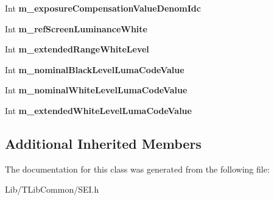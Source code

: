 \begin{DoxyCompactItemize}
\item 
\mbox{\label{class_s_e_i_tone_mapping_info_adbcd651babe98845b088910b87e4436a}} 
Int {\bfseries m\+\_\+exposure\+Compensation\+Value\+Denom\+Idc}
\item 
\mbox{\label{class_s_e_i_tone_mapping_info_a08287240f3bde1ec29950e25a36a51ac}} 
Int {\bfseries m\+\_\+ref\+Screen\+Luminance\+White}
\item 
\mbox{\label{class_s_e_i_tone_mapping_info_acab53b9f7ee20b3cc7b71cd5f24ae6e4}} 
Int {\bfseries m\+\_\+extended\+Range\+White\+Level}
\item 
\mbox{\label{class_s_e_i_tone_mapping_info_a25c9d2b19498cdd190c5f9d8373f6e0c}} 
Int {\bfseries m\+\_\+nominal\+Black\+Level\+Luma\+Code\+Value}
\item 
\mbox{\label{class_s_e_i_tone_mapping_info_ab17f5be23495c096485f35d3a41c8b37}} 
Int {\bfseries m\+\_\+nominal\+White\+Level\+Luma\+Code\+Value}
\item 
\mbox{\label{class_s_e_i_tone_mapping_info_af0073628e11caaf3e46fecc4c384d4b1}} 
Int {\bfseries m\+\_\+extended\+White\+Level\+Luma\+Code\+Value}
\end{DoxyCompactItemize}
\subsection*{Additional Inherited Members}


The documentation for this class was generated from the following file\+:\begin{DoxyCompactItemize}
\item 
Lib/\+T\+Lib\+Common/S\+E\+I.\+h\end{DoxyCompactItemize}
